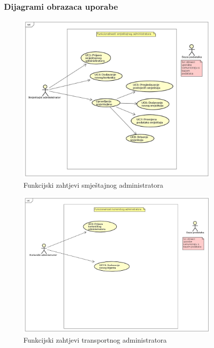 				\eject
				\subsubsection{Dijagrami obrazaca uporabe}
					\eject
					\begin{figure}[htbp]
						\centering
						\includegraphics[width=0.9\textwidth]{dijagrami/fun_house}
						\caption{Funkcijski zahtjevi smještajnog administratora}
						\label{fig:funHouse}
					\end{figure}
					\begin{figure}[htbp]
						\centering
						\includegraphics[width=0.9\textwidth]{dijagrami/fun_trans}
						\caption{Funkcijski zahtjevi transportnog administratora}
						\label{fig:funTrans}
					\end{figure}

